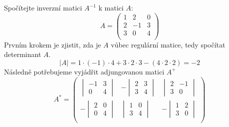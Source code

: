 \begin{example}
    Spočítejte inverzní matici $A^{-1}$ k matici $A$:
    \[A =
        \begin{pmatrix}
            1 & 2 & 0\\
            2 & -1 & 3 \\
            3 & 0 & 4 \\
        \end{pmatrix}
    \]
    Prvním krokem je zjistit, zda je $A$ vůbec regulární matice, tedy spočítat determinant $A$.
    $$|A| = 1 \cdot (-1) \cdot 4 + 3 \cdot 2 \cdot 3 - (4 \cdot 2 \cdot 2) = -2$$
    Následně potřebujeme vyjádřit adjungovanou matici $A^+$
    \[A^*=
        \begin{pmatrix}
            \begin{vmatrix}
                -1 & 3 \\
                0 & 4
            \end{vmatrix} &
            - \begin{vmatrix}
                2 & 3 \\
                3 & 4
            \end{vmatrix} &
            \begin{vmatrix}
                2 & -1 \\
                3 & 0
            \end{vmatrix} \\

            - \begin{vmatrix}
                2 & 0 \\
                0 & 4
            \end{vmatrix} &
            \begin{vmatrix}
                1 & 0 \\
                3 & 4
            \end{vmatrix} &
            - \begin{vmatrix}
                1 & 2 \\
                3 & 0
            \end{vmatrix} \\


\end{pmatrix}\]
\end{example}

